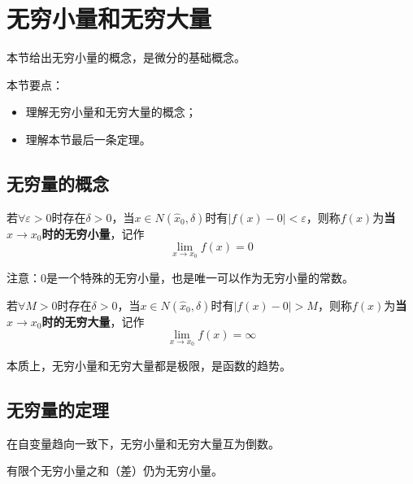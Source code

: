 \section{无穷小量和无穷大量}

本节给出无穷小量的概念，是微分的基础概念。

本节要点：
\begin{itemize}
    \item 理解无穷小量和无穷大量的概念；
    \item 理解本节最后一条定理。
\end{itemize}

\subsection{无穷量的概念}

\begin{definition}[无穷小量]
若$\forall \varepsilon >0$时存在$\delta >0$，当$x\in N\left( \hat{x}_0,\delta \right) $时有$\left| f\left( x \right) -0 \right|<\varepsilon $，则称$f\left( x \right) $为{\bf 当$x\rightarrow x_0$时的无穷小量}，记作
\[
\underset{x\rightarrow x_0}{\lim}f\left( x \right) =0
\]
\end{definition}

注意：0是一个特殊的无穷小量，也是唯一可以作为无穷小量的常数。

\begin{definition}[无穷大量]
若$\forall M>0$时存在$\delta >0$，当$x\in N\left( \hat{x}_0,\delta \right) $时有$\left| f\left( x \right) -0 \right|>M$，则称$f\left( x \right) $为{\bf 当$x\rightarrow x_0$时的无穷大量}，记作
\[
\underset{x\rightarrow x_0}{\lim}f\left( x \right) =\infty
\]
\end{definition}

本质上，无穷小量和无穷大量都是极限，是函数的趋势。

\subsection{无穷量的定理}

\begin{theorem}[互倒定理]
在自变量趋向一致下，无穷小量和无穷大量互为倒数。
\end{theorem}

\begin{theorem}[有限和定理]
有限个无穷小量之和（差）仍为无穷小量。
\end{theorem}

